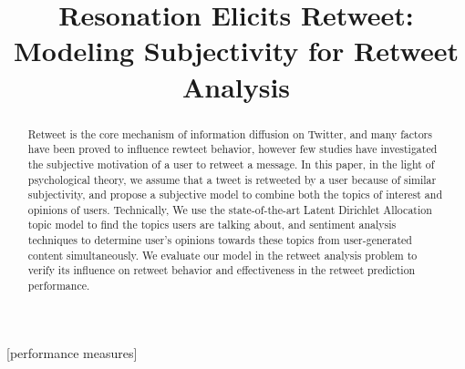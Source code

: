 \documentclass{acm_proc_article-sp}
\begin{document}
\title{Resonation Elicits Retweet: Modeling Subjectivity for Retweet Analysis}

\maketitle
\begin{abstract}
Retweet is the core mechanism of information diffusion on Twitter, and many factors have been proved to influence rewteet behavior, however few studies have investigated the subjective motivation of a user to retweet a message.
In this paper, in the light of psychological theory, we assume that a tweet is retweeted by a user because of similar subjectivity, and propose a subjective model to combine both the topics of interest and opinions of users. Technically, We use the state-of-the-art Latent Dirichlet Allocation topic model to find the topics users are talking about, and sentiment analysis techniques to determine user's opinions towards these topics from user-generated content simultaneously. 
We evaluate our model in the retweet analysis problem to verify its influence on retweet behavior and effectiveness in the retweet prediction performance.
\end{abstract}

[performance measures]


\end{document}
